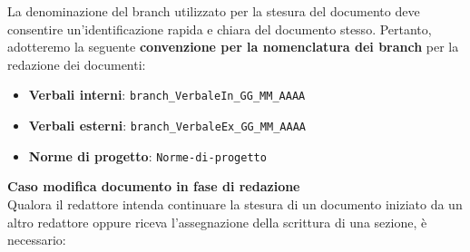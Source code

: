 \documentclass{article}
\begin{document}
    La denominazione del branch utilizzato per la stesura del documento deve consentire un'identificazione rapida e chiara del documento stesso. Pertanto, adotteremo la seguente \textbf{convenzione per la nomenclatura dei branch} per la redazione dei documenti:

    \begin{itemize}
        \item \textbf{Verbali interni}: \verb|branch_VerbaleIn_GG_MM_AAAA|
        \item \textbf{Verbali esterni}: \verb|branch_VerbaleEx_GG_MM_AAAA|
        \item \textbf{Norme di progetto}: \verb|Norme-di-progetto|
    \end{itemize}

    \textbf{Caso modifica documento in fase di redazione}\\
   Qualora il redattore intenda continuare la stesura di un documento iniziato da un altro redattore oppure riceva l'assegnazione della scrittura di una sezione, è necessario:
    
\end{document}
